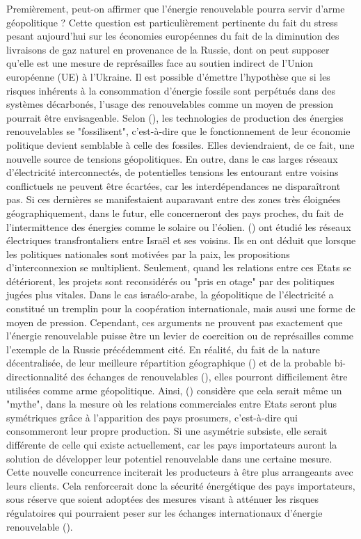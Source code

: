 Premièrement, peut-on affirmer que l'énergie renouvelable pourra servir d'arme géopolitique ? Cette question est particulièrement pertinente du fait du stress pesant aujourd'hui sur les économies européennes du fait de la diminution des livraisons de gaz naturel en provenance de la Russie, dont on peut supposer qu'elle est une mesure de représailles face au soutien indirect de l'Union européenne (UE) à l'Ukraine. Il est possible d'émettre l'hypothèse que si les risques inhérents à la consommation d'énergie fossile sont perpétués dans des systèmes décarbonés, l'usage des renouvelables comme un moyen de pression pourrait être envisageable. Selon (\cite{raman_fossilizing_2013}), les technologies de production des énergies renouvelables se "fossilisent", c'est-à-dire que le fonctionnement de leur économie politique devient semblable à celle des fossiles. Elles deviendraient, de ce fait, une nouvelle source de tensions géopolitiques.  
\smallbreak
En outre, dans le cas larges réseaux d'électricité interconnectés, de potentielles tensions les entourant entre voisins conflictuels ne peuvent être écartées, car les interdépendances ne disparaîtront pas. Si ces dernières se manifestaient auparavant entre des zones très éloignées géographiquement, dans le futur, elle concerneront des pays proches, du fait de l'intermittence des énergies comme le solaire ou l'éolien. (\cite{fischhendler_geopolitics_2016}) ont étudié les réseaux électriques transfrontaliers entre Israël et ses voisins. Ils en ont déduit que lorsque les politiques nationales sont motivées par la paix, les propositions d'interconnexion se multiplient. Seulement, quand les relations entre ces Etats se détériorent, les projets sont reconsidérés ou "pris en otage" par des politiques jugées plus vitales. Dans le cas israélo-arabe, la géopolitique de l'électricité a constitué un tremplin pour la coopération internationale, mais aussi une forme de moyen de pression.
\smallbreak
Cependant, ces arguments ne prouvent pas exactement que l'énergie renouvelable puisse être un levier de coercition ou de représailles comme l'exemple de la Russie précédemment cité. En réalité, du fait de la nature décentralisée, de leur meilleure répartition géographique (\cite{overland_are_2022}) et de la probable bi-directionnalité des échanges de renouvelables (\cite{leonard_resource_2022}), elles pourront difficilement être utilisées comme arme géopolitique. Ainsi, (\cite{overland_geopolitics_2019}) considère que cela serait même un "mythe", dans la mesure où les relations commerciales entre Etats seront plus symétriques grâce à l'apparition des pays prosumers, c'est-à-dire qui consommeront leur propre production. Si une asymétrie subsiste, elle serait différente de celle qui existe actuellement, car les pays importateurs auront la solution de développer leur potentiel renouvelable dans une certaine mesure. Cette nouvelle concurrence inciterait les producteurs à être plus arrangeants avec leurs clients. Cela renforcerait donc la sécurité énergétique des pays importateurs, sous réserve que soient adoptées des mesures visant à atténuer les risques régulatoires qui pourraient peser sur les échanges internationaux d'énergie renouvelable (\cite{escribano_frances_res_2013}).
